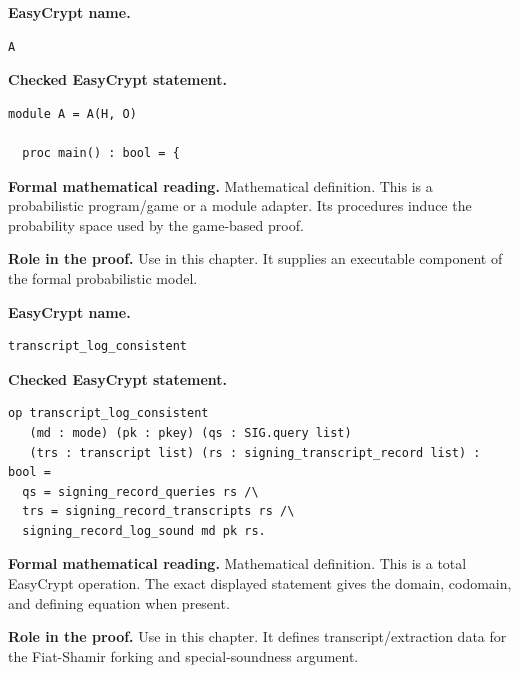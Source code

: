 \begin{formaldefinition}
\noindent\textbf{EasyCrypt name.}
\begin{lstlisting}[language=EasyCrypt,basicstyle=\ttfamily\scriptsize]
A
\end{lstlisting}
\noindent\textbf{Checked EasyCrypt statement.}
\begin{lstlisting}[language=EasyCrypt,basicstyle=\ttfamily\scriptsize]
module A = A(H, O)

  proc main() : bool = {
\end{lstlisting}
\noindent\textbf{Formal mathematical reading.}
Mathematical definition. This is a probabilistic program/game or a module adapter.  Its procedures induce the probability space used by the game-based proof.

\noindent\textbf{Role in the proof.}
Use in this chapter. It supplies an executable component of the formal probabilistic model.

\end{formaldefinition}

\begin{formaldefinition}
\noindent\textbf{EasyCrypt name.}
\begin{lstlisting}[language=EasyCrypt,basicstyle=\ttfamily\scriptsize]
transcript_log_consistent
\end{lstlisting}
\noindent\textbf{Checked EasyCrypt statement.}
\begin{lstlisting}[language=EasyCrypt,basicstyle=\ttfamily\scriptsize]
op transcript_log_consistent
   (md : mode) (pk : pkey) (qs : SIG.query list)
   (trs : transcript list) (rs : signing_transcript_record list) : bool =
  qs = signing_record_queries rs /\
  trs = signing_record_transcripts rs /\
  signing_record_log_sound md pk rs.
\end{lstlisting}
\noindent\textbf{Formal mathematical reading.}
Mathematical definition. This is a total EasyCrypt operation.  The exact displayed statement gives the domain, codomain, and defining equation when present.

\noindent\textbf{Role in the proof.}
Use in this chapter. It defines transcript/extraction data for the Fiat-Shamir forking and special-soundness argument.

\end{formaldefinition}

